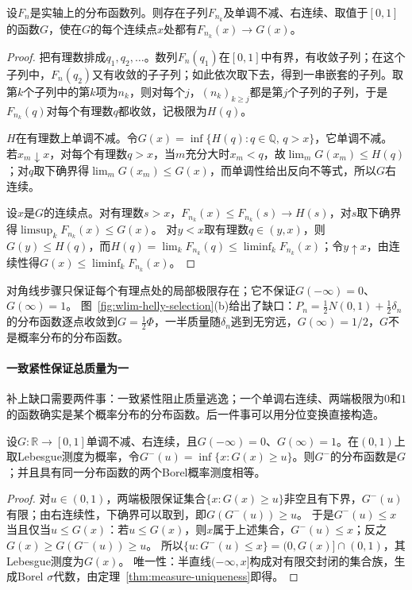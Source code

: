 \begin{lemma}
\label{lem:wlim-helly}
设$F_n$是实轴上的分布函数列。则存在子列$F_{n_k}$及单调不减、右连续、取值于$[0,1]$的函数$G$，使在$G$的每个连续点$x$处都有$F_{n_k}(x)\to G(x)$。
\end{lemma}

\begin{proof}
把有理数排成$q_1,q_2,\ldots$。数列$F_n(q_1)$在$[0,1]$中有界，有收敛子列；在这个子列中，$F_n(q_2)$又有收敛的子子列；如此依次取下去，得到一串嵌套的子列。取第$k$个子列中的第$k$项为$n_k$，则对每个$j$，$(n_k)_{k\geq j}$都是第$j$个子列的子列，于是$F_{n_k}(q)$对每个有理数$q$都收敛，记极限为$H(q)$。

$H$在有理数上单调不减。令$G(x)=\inf\{H(q):q\in\mathbb Q,\,q>x\}$，它单调不减。
若$x_m\downarrow x$，对每个有理数$q>x$，当$m$充分大时$x_m<q$，故$\lim_mG(x_m)\leq H(q)$；对$q$取下确界得$\lim_mG(x_m)\leq G(x)$，而单调性给出反向不等式，所以$G$右连续。

设$x$是$G$的连续点。对有理数$s>x$，$F_{n_k}(x)\leq F_{n_k}(s)\to H(s)$，对$s$取下确界得$\limsup_kF_{n_k}(x)\leq G(x)$。
对$y<x$取有理数$q\in(y,x)$，则$G(y)\leq H(q)$，而$H(q)=\lim_kF_{n_k}(q)\leq\liminf_kF_{n_k}(x)$；令$y\uparrow x$，由连续性得$G(x)\leq\liminf_kF_{n_k}(x)$。
\end{proof}

对角线步骤只保证每个有理点处的局部极限存在；它不保证$G(-\infty)=0$、$G(\infty)=1$。
图~\ref{fig:wlim-helly-selection}(b)给出了缺口：$P_n=\tfrac12N(0,1)+\tfrac12\delta_n$的分布函数逐点收敛到$G=\tfrac12\Phi$，一半质量随$\delta_n$逃到无穷远，$G(\infty)=1/2$，$G$不是概率分布的分布函数。

\paragraph{一致紧性保证总质量为一}
补上缺口需要两件事：一致紧性阻止质量逃逸；一个单调右连续、两端极限为$0$和$1$的函数确实是某个概率分布的分布函数。后一件事可以用分位变换直接构造。

\begin{lemma}[由分布函数构造分布]
\label{lem:wlim-quantile-construction}
设$G:\mathbb R\to[0,1]$单调不减、右连续，且$G(-\infty)=0$、$G(\infty)=1$。在$(0,1)$上取Lebesgue测度为概率，令$G^{-}(u)=\inf\{x:G(x)\geq u\}$。则$G^{-}$的分布函数是$G$；并且具有同一分布函数的两个Borel概率测度相等。
\end{lemma}

\begin{proof}
对$u\in(0,1)$，两端极限保证集合$\{x:G(x)\geq u\}$非空且有下界，$G^{-}(u)$有限；由右连续性，下确界可以取到，即$G(G^{-}(u))\geq u$。
于是$G^{-}(u)\leq x$当且仅当$u\leq G(x)$：若$u\leq G(x)$，则$x$属于上述集合，$G^{-}(u)\leq x$；反之$G(x)\geq G(G^{-}(u))\geq u$。
所以$\{u:G^{-}(u)\leq x\}=(0,G(x)]\cap(0,1)$，其Lebesgue测度为$G(x)$。
唯一性：半直线$(-\infty,x]$构成对有限交封闭的集合族，生成Borel $\sigma$代数，由定理~\ref{thm:measure-uniqueness}即得。
\end{proof}

